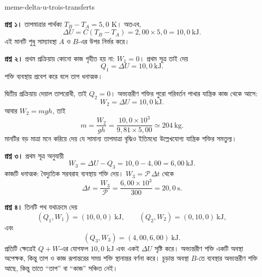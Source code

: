 \begin{exo}[একই অভ্যন্তরীণ শক্তির পরিবর্তন, স্থানান্তরের তিন পদ্ধতি]{meme-delta-u-trois-transferts}
\begin{solution}
\textbf{প্রশ্ন ১।} তাপমাত্রার পার্থক্য $T_B-T_A=5{,}0$ K। অতএব,
\[
\Delta U=C(T_B-T_A)
=2{,}00\times5{,}0
=10{,}0\ \mathrm{kJ}.
\]
এই মানটি শুধু সাম্যাবস্থা $A$ ও $B$-এর উপর নির্ভর করে।

\textbf{প্রশ্ন ২।} প্রথম প্রক্রিয়ায় কোনো কাজ গৃহীত হয় না: $W_1=0$। প্রথম সূত্র তাই দেয়
\[
Q_1=\Delta U=10{,}0\ \mathrm{kJ}.
\]
শক্তি ব্যবস্থায় প্রবেশ করে বলে তাপ ধনাত্মক।

দ্বিতীয় প্রক্রিয়ায় দেয়াল তাপরোধী, তাই $Q_2=0$। অভ্যন্তরীণ শক্তির পুরো
পরিবর্তন পাখার যান্ত্রিক কাজ থেকে আসে:
\[
W_2=\Delta U=10{,}0\ \mathrm{kJ}.
\]
আবার $W_2=mgh$, তাই
\[
m=\frac{W_2}{gh}
=\frac{10{,}0\times10^3}{9{,}81\times5{,}00}
\simeq 204\ \mathrm{kg}.
\]
মানটির বড় মাত্রা মনে করিয়ে দেয় যে সামান্য তাপমাত্রা বৃদ্ধিও ইতিমধ্যে
উল্লেখযোগ্য যান্ত্রিক শক্তির সমতুল্য।

\textbf{প্রশ্ন ৩।} প্রথম সূত্র অনুযায়ী
\[
W_3=\Delta U-Q_3=10{,}0-4{,}00=6{,}00\ \mathrm{kJ}.
\]
কাজটি ধনাত্মক: বৈদ্যুতিক সরবরাহ ব্যবস্থায় শক্তি দেয়। $W_3=\mathcal P\,\Delta t$ থেকে
\[
\Delta t=\frac{W_3}{\mathcal P}
=\frac{6{,}00\times10^3}{300}
=20{,}0\ \mathrm{s}.
\]

\textbf{প্রশ্ন ৪।} তিনটি পথ যথাক্রমে দেয়
\[
(Q_1,W_1)=(10{,}0,0)\ \mathrm{kJ},
\qquad
(Q_2,W_2)=(0,10{,}0)\ \mathrm{kJ},
\]
এবং
\[
(Q_3,W_3)=(4{,}00,6{,}00)\ \mathrm{kJ}.
\]
প্রতিটি ক্ষেত্রেই $Q+W$-এর যোগফল $10{,}0$ kJ এবং একই $\Delta U$ সৃষ্টি করে।
অভ্যন্তরীণ শক্তি একটি অবস্থা অপেক্ষক, কিন্তু তাপ ও কাজ রূপান্তরের সময় শক্তি
স্থানান্তর বর্ণনা করে। চূড়ান্ত অবস্থা $B$-তে ব্যবস্থার অভ্যন্তরীণ শক্তি আছে,
কিন্তু তাতে “তাপ” বা “কাজ” সঞ্চিত নেই।
\end{solution}
\end{exo}

